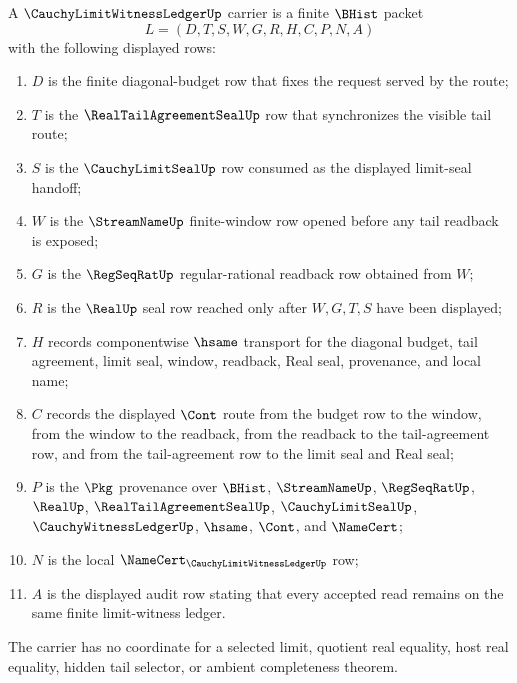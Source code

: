 \begin{definition}
\label{def:cauchy-limit-witness-ledger-carrier}
A $\CauchyLimitWitnessLedgerUp$ carrier is a finite $\BHist$ packet
$$
L=(D,T,S,W,G,R,H,C,P,N,A)
$$
with the following displayed rows:
\begin{enumerate}
\item $D$ is the finite diagonal-budget row that fixes the request served by the route;
\item $T$ is the $\RealTailAgreementSealUp$ row that synchronizes the visible tail route;
\item $S$ is the $\CauchyLimitSealUp$ row consumed as the displayed limit-seal handoff;
\item $W$ is the $\StreamNameUp$ finite-window row opened before any tail readback is exposed;
\item $G$ is the $\RegSeqRatUp$ regular-rational readback row obtained from $W$;
\item $R$ is the $\RealUp$ seal row reached only after $W,G,T,S$ have been displayed;
\item $H$ records componentwise $\hsame$ transport for the diagonal budget, tail agreement, limit seal, window, readback, Real seal, provenance, and local name;
\item $C$ records the displayed $\Cont$ route from the budget row to the window, from the window to the readback, from the readback to the tail-agreement row, and from the tail-agreement row to the limit seal and Real seal;
\item $P$ is the $\Pkg$ provenance over $\BHist$, $\StreamNameUp$, $\RegSeqRatUp$, $\RealUp$, $\RealTailAgreementSealUp$, $\CauchyLimitSealUp$, $\CauchyWitnessLedgerUp$, $\hsame$, $\Cont$, and $\NameCert$;
\item $N$ is the local $\NameCert_{\CauchyLimitWitnessLedgerUp}$ row;
\item $A$ is the displayed audit row stating that every accepted read remains on the same finite limit-witness ledger.
\end{enumerate}
The carrier has no coordinate for a selected limit, quotient real equality, host real equality, hidden tail selector, or ambient completeness theorem.
\end{definition}

